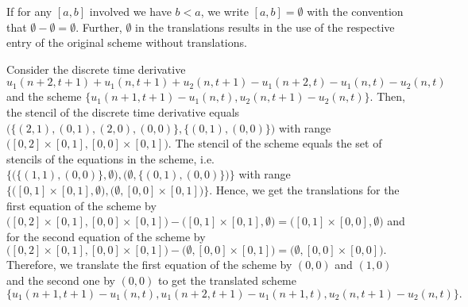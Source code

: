 \documentclass[runningheads]{llncs}
\newcommand{\1}{\chi}
\begin{document}
If for any $[a,b]$ involved we have $b<a$, we write $[a,b]=\emptyset$ with the convention that $\emptyset-\emptyset=\emptyset$.  Further, $\emptyset$ in the translations results in the use of the respective entry of the original scheme without translations.
\begin{example}
	Consider the discrete time derivative
$
		u_1(n+2,t+1)+u_1(n,t+1)+u_2(n,t+1)-u_1(n+2,t)-u_1(n,t)-u_2(n,t)
$
	and the scheme
	$
	\{u_1(n+1,t+1)-u_1(n,t),u_2(n,t+1)-u_2(n,t)\}.
	$
	Then, the stencil of the discrete time derivative equals
$
		\Big( \big\{ (2,1),(0,1),(2,0),(0,0) \big\},\big\{(0,1),(0,0)\big\} \Big)
$
	with range
	$
	\Big([0,2]\times[0,1],[0,0]\times [0,1]\Big).
	$
	The stencil of the scheme equals the set of stencils of the equations in the scheme, i.e.
$
		\Big\{\Big(\big\{(1,1),(0,0)\big\},\emptyset\Big),\Big(\emptyset,\big\{(0,1),(0,0)\big\}\Big)\Big\}
$
	with range
	$
	\Big\{\Big([0,1]\times[0,1],\emptyset\Big),\Big(\emptyset,[0,0]\times [0,1]\Big)\Big\}.
	$
	Hence, we get the translations for the first equation of the scheme by
$
		\Big([0,2]\times[0,1],[0,0]\times [0,1]\Big)-\Big([0,1]\times[0,1],\emptyset\Big)=\Big([0,1]\times[0,0],\emptyset\Big)
$
	and for the second equation of the scheme by
$
		\Big([0,2]\times[0,1],[0,0]\times [0,1]\Big)-\Big(\emptyset,[0,0]\times [0,1]\Big)=\Big(\emptyset,[0,0]\times [0,0]\Big).
$
	Therefore, we translate the first equation of the scheme by $(0,0)$ and $(1,0)$ and the second one by $(0,0)$ to get the translated scheme
$
		\{u_1(n+1,t+1)-u_1(n,t),
		u_1(n+2,t+1)-u_1(n+1,t),
		u_2(n,t+1)-u_2(n,t)
		\}.
$
\end{example}
\end{document}
